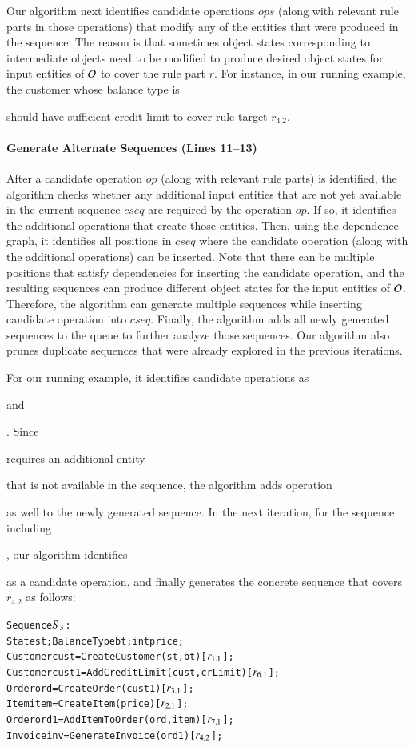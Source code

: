 Our algorithm next identifies candidate operations $ops$ (along with relevant
rule parts in those operations) that modify any of the entities
that were produced in the sequence. The reason is that sometimes object states 
corresponding to intermediate objects need to be modified to produce desired object states
for input entities of ${\cal O}$ to cover the rule part $r$. 
For instance, in our running example, the customer whose balance type
is \subject{Credit} should have sufficient credit limit to cover rule target $r_{4.2}$.

\vskip -7pt
\paragraph*{Generate Alternate Sequences (Lines 11--13)} After a candidate
operation $op$ (along with relevant rule parts) is identified, the algorithm checks
whether any additional input entities that are not yet available in the current
sequence $cseq$ are required by the operation $op$.  If so, it identifies the
additional operations that create those entities. Then, using the dependence
graph, it identifies all positions in $cseq$ where the candidate operation
(along with the additional operations) can be inserted. Note that there can be
multiple positions that satisfy dependencies for inserting the candidate
operation, and the resulting sequences can produce different object states for
the input entities of ${\cal O}$.  Therefore, the algorithm can generate
multiple sequences while inserting candidate operation into $cseq$. Finally, the
algorithm adds all newly generated sequences to the queue to further analyze
those sequences. Our algorithm also prunes duplicate sequences that were already
explored in the previous iterations.

For our running example, it identifies candidate operations as 
\subject{AddItemToOrder} and \subject{AddCreditLimit}. Since \subject{AddItemToOrder} requires an additional
entity \subject{Item} that is not available in the sequence, the algorithm adds
operation \subject{CreateItem} as well to the newly generated sequence. 
In the next iteration, for the sequence including \subject{AddCreditLimit},
our algorithm identifies \subject{AddItemToOrder} as a candidate operation, and 
finally generates the concrete sequence that covers $r_{4.2}$
as follows:

\vspace*{-4pt}
{\scriptsize
\begin{alltt}
 Sequence \(S\sb{3}\):
 State st; BalanceType bt; int price;
 Customer cust = CreateCustomer(st, bt) [\(r\sb{1.1}\)];
 Customer cust1 = AddCreditLimit(cust, crLimit) [\(r\sb{6.1}\)];
 Order ord = CreateOrder(cust1) [\(r\sb{3.1}\)];
 Item item = CreateItem(price) [\(r\sb{2.1}\)];
 Order ord1 = AddItemToOrder(ord, item) [\(r\sb{7.1}\)];
 Invoice inv = GenerateInvoice(ord1) [\(r\sb{4.2}\)];  
\end{alltt}
}
\vspace*{-5pt}


